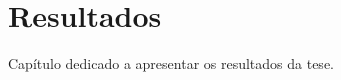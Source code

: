 \chapter{Resultados}
\label{chapter:resultados}
Capítulo dedicado a apresentar os resultados da tese.






